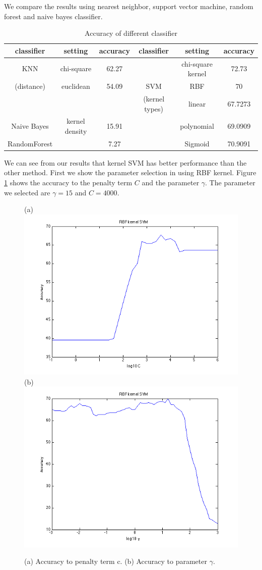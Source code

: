 \documentclass{article} %
\begin{document}
We compare the results using nearest neighbor, support vector machine, random forest and naive bayes classifier.


\begin{table}[t]
\caption{Accuracy of different classifier}
\begin{center}
\begin{tabular}{|c|c|c|c|c|c|}
\hline
   classifier  & setting      &accuracy   & classifier    & setting      & accuracy\\
\hline
KNN     & chi-square    &62.27      &     &chi-square kernel  &72.73\\ \cline{2-3} \cline{5-6}
(distance) & euclidean     &54.09      &   SVM    & RBF               &70\\ \cline{1-3} \cline{5-6}
       &               &     &    (kernel types)    & linear            &67.7273\\ \cline{1-3} \cline{5-6}
Naive Bayes  & kernel density  & 15.91           &       & polynomial        &69.0909\\ \cline{1-3} \cline{5-6}
 RandomForest &         & 7.27                 &       & Sigmoid           &70.9091\\ \hline
\end{tabular}
\end{center}
\end{table}

We can see from our results that kernel SVM has better performance than the other method. First we show the parameter selection in using RBF kernel. Figure \ref{fig:RBF} shows the accuracy to the penalty term $C$ and the parameter $\gamma$. The parameter we selected are $\gamma = 15$ and $C = 4000$.

\begin{figure}[ht!]
    \centering
    {(a)\includegraphics[width=0.45\linewidth]{../Figure/RBF_cost_accuracy}
    (b)\includegraphics[width=0.45\linewidth]{../Figure/RBF_gamma_accuracy}}
    \caption{(a) Accuracy to penalty term c. (b) Accuracy to parameter $\gamma$. }
    \label{fig:RBF}
\end{figure}
\end{document}
